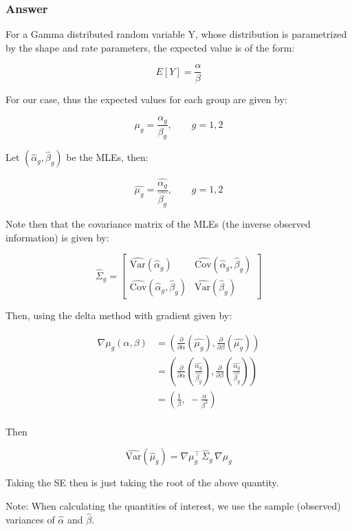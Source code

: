 \documentclass[
]{article}
\begin{document}
\subsubsection{Answer}\label{answer-3}

For a Gamma distributed random variable Y, whose distribution is
parametrized by the shape and rate parameters, the expected value is of
the form:

\[
E[Y] = \frac{\alpha}{\beta}
\]

For our case, thus the expected values for each group are given by:

\[
\mu_g = \frac{\alpha_g}{\beta_g},\qquad g=1,2
\]

Let \((\hat\alpha_g,\hat\beta_g)\) be the MLEs, then:

\[
\hat{\mu_g} = \frac{\hat{\alpha_g}}{\hat{\beta_g}},\qquad g=1,2
\]

Note then that the covariance matrix of the MLEs (the inverse observed
information) is given by:

\[
\widehat\Sigma_g = \begin{bmatrix}\widehat{\mathrm{Var}}(\hat\alpha_g) & \widehat{\mathrm{Cov}}(\hat\alpha_g,\hat\beta_g)\\ \widehat{\mathrm{Cov}}(\hat\alpha_g,\hat\beta_g) & \widehat{\mathrm{Var}}(\hat\beta_g)\end{bmatrix}
\]

Then, using the delta method with gradient given by:

\[
\begin{aligned}
\nabla\mu_g(\alpha,\beta) 
&= (\frac{\partial}{\partial \alpha} (\hat{\mu_g}), \frac{\partial}{\partial \beta} (\hat{\mu_g})) \\ 
&= (\frac{\partial}{\partial \alpha} (\frac{\hat{\alpha_g}}{\hat{\beta_g}}), \frac{\partial}{\partial \beta} (\frac{\hat{\alpha_g}}{\hat{\beta_g}})) \\ 
&= \left(\tfrac{1}{\beta},\; -\tfrac{\alpha}{\beta^2}\right) \\ 
\end{aligned}
\]

Then

\[
\widehat{\mathrm{Var}}(\hat\mu_g)
= \nabla\mu_g^\top \,\widehat\Sigma_g \,\nabla\mu_g
\]

Taking the SE then is just taking the root of the above quantity.

Note: When calculating the quantities of interest, we use the sample
(observed) variances of \(\hat{\alpha}\) and \(\hat{\beta}\).
\end{document}
